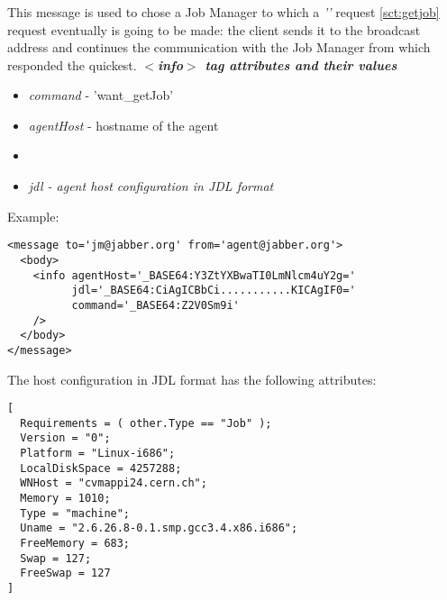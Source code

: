 \subsubsection{}
\label{sct:wantgetjob}
This message is used to chose a Job Manager to which a \emph{''} request \ref{sct:getjob} request eventually is
going to be made: the client sends it to the broadcast address and continues the communication with the Job Manager from which responded the quickest.
\emph{\bf $<$info$>$ tag attributes and their values}
\begin{itemize}
  \item \emph{command} - 'want\_getJob'
  \item \emph{agentHost} - hostname of the agent
  \item {}
  \item \emph{jdl - agent host configuration in JDL format}
\end{itemize}

Example:

\lstset{tabsize=2, basicstyle=\footnotesize, captionpos=b}
\lstset{frame=single, language=XML}
\begin{lstlisting}
<message to='jm@jabber.org' from='agent@jabber.org'>
  <body>
    <info agentHost='_BASE64:Y3ZtYXBwaTI0LmNlcm4uY2g='
          jdl='_BASE64:CiAgICBbCi...........KICAgIF0='
          command='_BASE64:Z2V0Sm9i'
    />
  </body>
</message>
\end{lstlisting}

The host configuration in JDL format has the following attributes:

\lstset{tabsize=2, basicstyle=\footnotesize, captionpos=b}
\lstset{caption=Example host configuration in JDL format, label=fig:wantgetjobexpl}
\lstset{frame=single}
\begin{lstlisting}
[
  Requirements = ( other.Type == "Job" );
  Version = "0";
  Platform = "Linux-i686";
  LocalDiskSpace = 4257288;
  WNHost = "cvmappi24.cern.ch";
  Memory = 1010;
  Type = "machine";
  Uname = "2.6.26.8-0.1.smp.gcc3.4.x86.i686";
  FreeMemory = 683;
  Swap = 127;
  FreeSwap = 127
]
\end{lstlisting}

